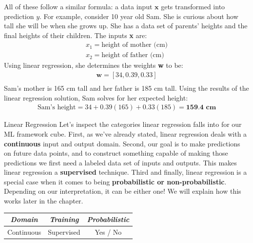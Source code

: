 
All of these follow a similar formula: a data input $\textbf{x}$ gets transformed into prediction $y$. For example, consider 10 year old Sam. She is curious about how tall she will be when she grows up. She has a data set of parents' heights and the final heights of their children. The inputs \textbf{x} are:
\begin{align*}
x_{1} = \text{height of mother (cm)} \\
x_{2} = \text{height of father (cm)}
\end{align*}
Using linear regression, she determines the weights \textbf{w} to be:
\begin{align*}
\textbf{w} = [34, 0.39, 0.33] \\
\end{align*}
Sam's mother is 165 cm tall and her father is 185 cm tall. Using the results of the linear regression solution, Sam solves for her expected height:
\begin{align*}
\text{Sam's height} = 34 + 0.39(165) + 0.33(185) = \textbf{159.4 cm}
\end{align*}

\begin{mlcube}{Linear Regression}
Let's inspect the categories linear regression falls into for our ML framework cube. First, as we've already stated, linear regression deals with a \textbf{continuous} input and output domain. Second, our goal is to make predictions on future data points, and to construct something capable of making those predictions we first need a labeled data set of inputs and outputs. This makes linear regression a \textbf{supervised} technique. Third and finally, linear regression is a special case when it comes to being \textbf{probabilistic or non-probabilistic}. Depending on our interpretation, it can be either one! We will explain how this works later in the chapter.
\begin{center}
    \begin{tabular}{c|c|c}
    \textit{\textbf{Domain}} & \textit{\textbf{Training}} & \textit{\textbf{Probabilistic}} \\
    \hline
    Continuous & Supervised & Yes / No \\
    \end{tabular}
\end{center}
\end{mlcube}

